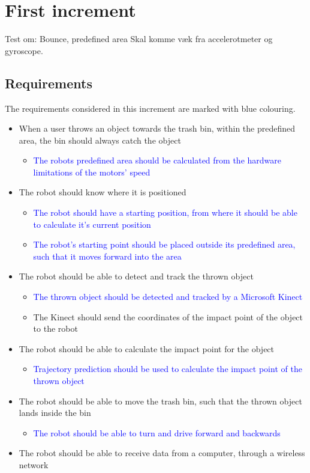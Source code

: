 \chapter{First increment}
\label{chap:First Increment}
Test om: Bounce, predefined area
Skal komme væk fra accelerotmeter og gyroscope. 

\section{Requirements}
\label{sec:i1Requirements}
The requirements considered in this increment are marked with blue colouring.

\begin{itemize}
	\item When a user throws an object towards the trash bin, within the predefined area, the bin should always catch the object
	\begin{itemize}
		\item \textcolor{blue}{The robots predefined area should be calculated from the hardware limitations of the motors’ speed}
	\end{itemize}
	\item The robot should know where it is positioned
	\begin{itemize}
		\item \textcolor{blue}{The robot should have a starting position, from where it should be able to calculate it's current position }
		\item \textcolor{blue}{The robot's starting point should be placed outside its predefined area, such that it moves forward into the area}
	\end{itemize}
	\item The robot should be able to detect and track the thrown object
	\begin{itemize}
		\item \textcolor{blue}{The thrown object should be detected and tracked by a Microsoft Kinect}
		\item The Kinect should send the coordinates of the impact point of the object to the robot
	\end{itemize}
	\item The robot should be able to calculate the impact point for the object
	\begin{itemize}
		\item \textcolor{blue}{Trajectory prediction should be used to calculate the impact point of the thrown object}
	\end{itemize}
	\item The robot should be able to move the trash bin, such that the thrown object lands inside the bin
	\begin{itemize}
		\item \textcolor{blue}{The robot should be able to turn and drive forward and backwards}
	\end{itemize}
	\item {The robot should be able to receive data from a computer, through a wireless network}
\end{itemize}


